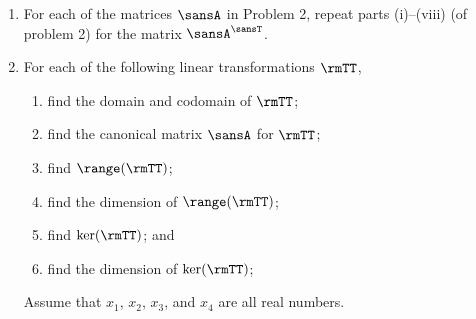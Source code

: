 \documentclass[12 pt]{article}
\begin{document}
\begin{enumerate}[leftmargin=0in, rightmargin=-0.25in]
	\begin{adjustwidth}{-0.125in}{-0.125in}
		\begin{multicols}{3}
			\begin{enumerate}[itemsep=6mm]
				\item $\sansA=\pmat{1 & -1 & 1 & 3 \\ 0 & 2 & 3 & 1 \\ 3 & -7 & -3 &  7}$
				\item $\sansA=\pmat{-2 & 1 & 3 \\ 4 & 1 & 1 \\ 1 & 0 & 1 \\ 0 & 2 & 2 \\ 3 & -2 & 4}$
				\item $\sansA=\pmat{1 & 2 & 3 & 4 \\ 5 & 6 & 7 & 8 \\ -1 & -2 & 3 & -4 \\ 9 & 10 & -11 & 12}$
			\end{enumerate}
		\end{multicols}
	\end{adjustwidth} 

	\vspace{-12mm}
	
	\item For each of the matrices $\sansA$ in Problem 2, repeat parts (i)--(viii) (of problem 2) for the matrix $\sansA^\sansT$.
	
	\newpage
	
	\item For each of the following linear transformations $\rmTT$,
	\begin{enumerate}[label=(\roman*),leftmargin=16mm,itemsep=2.5mm]
		\item find the domain and codomain of $\rmTT$;
		\item find the canonical matrix $\sansA$ for $\rmTT$;
		\item find $\range(\rmTT)$;
		\item find the dimension of $\range(\rmTT)$;
		\item find $\ker(\rmTT)$; and
		\item find the dimension of $\ker(\rmTT)$;
	\end{enumerate}
	Assume that $x_1$, $x_2$, $x_3$, and $x_4$ are all real numbers.
	
	\vspace{3mm}
	

\end{enumerate}
\end{document}
